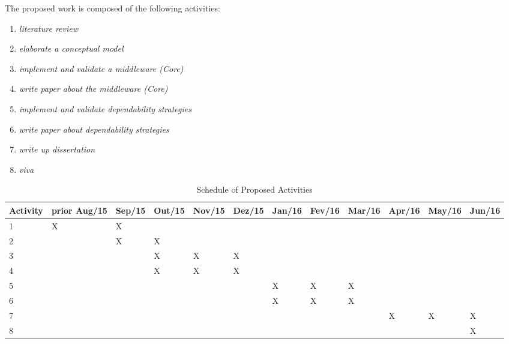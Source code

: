 The proposed work is composed of the following activities:

\begin{enumerate}
\item \emph{literature review}
\item \emph{elaborate a conceptual model}
\item \emph{implement and validate a middleware (Core)}
\item \emph{write paper about the middleware (Core)}
\item \emph{implement and validate dependability strategies}
 \item \emph{write paper about dependability strategies}
\item \emph{write up dissertation}
\item \emph{viva}


\end{enumerate}

\begin{table}[htbp]
\tiny
\begin{flushleft}
\begin{tabular}{|p{1.1cm}|p{0.75cm}|p{0.75cm}|p{0.75cm}|p{0.75cm}|p{0.75cm}|p{0.75cm}|p{0.75cm}|p{0.75cm}|p{0.75cm}|p{0.75cm}|p{0.75cm}|}
\hline
\textbf{Activity}&	\textbf{prior Aug/15}&	\textbf{Sep/15}&	\textbf{Out/15}&	\textbf{Nov/15}&	\textbf{Dez/15}&	\textbf{Jan/16}&	\textbf{Fev/16}&	\textbf{Mar/16}&	\textbf{Apr/16}&	\textbf{May/16}&	\textbf{Jun/16}\\
\hline	1			&	X	&	 X  &	 		&			&		&		&	 		&	 		&	 	&		 &				\\
\hline	2			&		&	 X	&	 X	&			&		&		&	 		&	 		&	 	&		 &				\\
\hline	3			&		&	  	&	 X	&	X	  &	X	&		&	 	  &	   	&	 	&		 &				\\
\hline	4			&		&	  	&	 X	&	X	  &	X	&		&	 	  &	   	&	 	&		 &				\\
\hline	5			&		&	 		&	 		&			&		&	X	&	 X	&	 X	&	  &		 &				\\
\hline	6			&		&	 		&	 		&			&		&	X	&	 X	&	 X	&	  &		 &				\\
\hline	7			&		&	 		&	 		&			&		&		&	 		&	 		&	X	&	X	 &	X			\\
\hline	8			&		&	 		&	 		&			&		&		&	 		&	 		&	  &		 &	X			\\
\hline
\end{tabular}
\end{flushleft}
\caption{Schedule of Proposed Activities}
\label{tbcrono}
\end{table}
